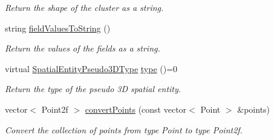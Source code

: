 \begin{DoxyCompactItemize}
\begin{DoxyCompactList}\small\item\em Return the shape of the cluster as a string. \end{DoxyCompactList}\item 
string \hyperlink{classmultiscale_1_1analysis_1_1SpatialEntityPseudo3D_a232a5e4991e59dfc685107982fcaf0ce}{field\-Values\-To\-String} ()
\begin{DoxyCompactList}\small\item\em Return the values of the fields as a string. \end{DoxyCompactList}\item 
virtual \hyperlink{namespacemultiscale_1_1analysis_a6db9cbf10615e77e300c3e4cb1c56660}{Spatial\-Entity\-Pseudo3\-D\-Type} \hyperlink{classmultiscale_1_1analysis_1_1SpatialEntityPseudo3D_ac0d4656a44cc724c2cc7d34d8b15dbd8}{type} ()=0
\begin{DoxyCompactList}\small\item\em Return the type of the pseudo 3\-D spatial entity. \end{DoxyCompactList}\item 
vector$<$ Point2f $>$ \hyperlink{classmultiscale_1_1analysis_1_1SpatialEntityPseudo3D_a2175fefa47f158b22872af80010543b1}{convert\-Points} (const vector$<$ Point $>$ \&points)
\begin{DoxyCompactList}\small\item\em Convert the collection of points from type Point to type Point2f. \end{DoxyCompactList}\end{DoxyCompactItemize}
